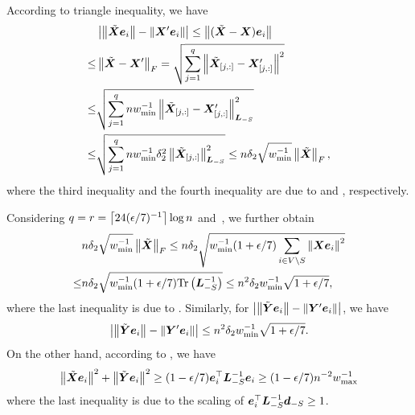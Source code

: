 \documentclass[10pt,twocolumn,twoside]{IEEEtran}
\begin{document}
\begin{IEEEproof}
    According to triangle inequality, we have
    \begin{align*}
            & \left|\left\Vert\tilde{\boldsymbol{X}}\boldsymbol{e}_i\right\Vert-\left\Vert\boldsymbol{X}'\boldsymbol{e}_i\right\Vert \right|\le\left\Vert(\tilde{\boldsymbol{X}}-\boldsymbol{X})\boldsymbol{e}_i\right\Vert                                                   \\
        \le & \left\Vert\tilde{\boldsymbol{X}}-\boldsymbol{X}'\right\Vert_{F}= \sqrt{\sum_{j=1}^q\left\Vert\tilde{\boldsymbol{X}}_{[j,:]}-\boldsymbol{X}'_{[j,:]}\right\Vert^2}                                             \\
        \le & \sqrt{\sum_{j=1}^qnw_{\min}^{-1}\left\Vert\tilde{\boldsymbol{X}}_{[j,:]}-\boldsymbol{X}'_{[j,:]}\right\Vert_{\boldsymbol{L}_{-S}}^2}                                                   \\
        \le & \sqrt{\sum_{j=1}^qnw_{\min}^{-1}\delta_2^2\left\Vert\tilde{\boldsymbol{X}}_{[j,:]}\right\Vert_{\boldsymbol{L}_{-S}}^2}\le n\delta_2\sqrt{w_{\min}^{-1}}\left\Vert\tilde{\boldsymbol{X}}\right\Vert_F,
    \end{align*}
    where the third inequality and the fourth inequality are due to  and , respectively.

    Considering \(q=r=\left\lceil24(\epsilon/7)^{-1}\right\rceil\log n\) and~, we further obtain
    \begin{align*}
            & n\delta_2\sqrt{w_{\min}^{-1}}\left\Vert\tilde{\boldsymbol{X}}\right\Vert_F\le n\delta_2\sqrt{w_{\min}^{-1}(1+\epsilon/7)\sum_{i\in V\setminus S}\left\Vert\boldsymbol{X}\boldsymbol{e}_i\right\Vert^2} \\
        \le & n\delta_2\sqrt{w_{\min}^{-1}(1+\epsilon/7)\mathrm{Tr}\left(\boldsymbol{L}_{-S}^{-1}\right)}\le n^2\delta_2w_{\min}^{-1}\sqrt{1+\epsilon/7},
    \end{align*}
    where the last inequality is due to .
    Similarly, for \(\left|\left\Vert\tilde{\boldsymbol{Y}}\boldsymbol{e}_i\right\Vert-\left\Vert\boldsymbol{Y}'\boldsymbol{e}_i\right\Vert \right|\), we have
    \begin{equation}\label{eq:approx-maty-raw}
        \left|\left\Vert\tilde{\boldsymbol{Y}}\boldsymbol{e}_i\right\Vert-\left\Vert\boldsymbol{Y}'\boldsymbol{e}_i\right\Vert \right|\le n^2\delta_2w_{\min}^{-1}\sqrt{1+\epsilon/7}.
    \end{equation}
    On the other hand, according to , we have
    \[\left\Vert\tilde{\boldsymbol{X}}\boldsymbol{e}_i\right\Vert^2+\left\Vert\tilde{\boldsymbol{Y}}\boldsymbol{e}_i\right\Vert^2\ge(1-\epsilon/7)\boldsymbol{e}_i^\top\boldsymbol{L}_{-S}^{-1}\boldsymbol{e}_i\ge(1-\epsilon/7)n^{-2}w_{\max}^{-1}\]
    where the last inequality is due to the scaling of \(\boldsymbol{e}_i^\top\boldsymbol{L}_{-S}^{-1}\boldsymbol{d}_{-S}\ge1\).


\end{IEEEproof}
\end{document}

